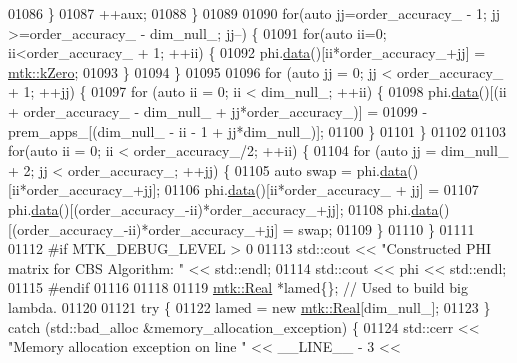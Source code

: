 \begin{DoxyCode}
{{01086       \}
01087       ++aux;
01088     \}
01089 
01090     \textcolor{keywordflow}{for}(\textcolor{keyword}{auto} jj=order\_accuracy\_ - 1; jj >=order\_accuracy\_ - dim\_null\_; jj--) \{
01091       \textcolor{keywordflow}{for}(\textcolor{keyword}{auto} ii=0; ii<order\_accuracy\_ + 1; ++ii) \{
01092         phi.\hyperlink{classmtk_1_1DenseMatrix_a0c33b8a9e01d157c61ddbdf807c25d84}{data}()[ii*order\_accuracy\_+jj] = \hyperlink{group__c01-roots_ga59a451a5fae30d59649bcda274fea271}{mtk::kZero};
01093       \}
01094     \}
01095 
01096     \textcolor{keywordflow}{for} (\textcolor{keyword}{auto} jj = 0; jj < order\_accuracy\_ + 1; ++jj) \{
01097       \textcolor{keywordflow}{for} (\textcolor{keyword}{auto} ii = 0; ii < dim\_null\_; ++ii) \{
01098         phi.\hyperlink{classmtk_1_1DenseMatrix_a0c33b8a9e01d157c61ddbdf807c25d84}{data}()[(ii + order\_accuracy\_ - dim\_null\_ + jj*order\_accuracy\_)] =
01099           -prem\_apps\_[(dim\_null\_ - ii - 1 + jj*dim\_null\_)];
01100       \}
01101     \}
01102 
01103     \textcolor{keywordflow}{for}(\textcolor{keyword}{auto} ii = 0; ii < order\_accuracy\_/2; ++ii) \{
01104       \textcolor{keywordflow}{for} (\textcolor{keyword}{auto} jj = dim\_null\_ + 2; jj < order\_accuracy\_; ++jj) \{
01105         \textcolor{keyword}{auto} swap = phi.\hyperlink{classmtk_1_1DenseMatrix_a0c33b8a9e01d157c61ddbdf807c25d84}{data}()[ii*order\_accuracy\_+jj];
01106         phi.\hyperlink{classmtk_1_1DenseMatrix_a0c33b8a9e01d157c61ddbdf807c25d84}{data}()[ii*order\_accuracy\_ + jj] =
01107           phi.\hyperlink{classmtk_1_1DenseMatrix_a0c33b8a9e01d157c61ddbdf807c25d84}{data}()[(order\_accuracy\_-ii)*order\_accuracy\_+jj];
01108         phi.\hyperlink{classmtk_1_1DenseMatrix_a0c33b8a9e01d157c61ddbdf807c25d84}{data}()[(order\_accuracy\_-ii)*order\_accuracy\_+jj] = swap;
01109       \}
01110     \}
01111 
01112 \textcolor{preprocessor}{    #if MTK\_DEBUG\_LEVEL > 0}
01113     std::cout << \textcolor{stringliteral}{"Constructed PHI matrix for CBS Algorithm: "} << std::endl;
01114     std::cout << phi << std::endl;
01115 \textcolor{preprocessor}{    #endif}
01116 
01118 
01119     \hyperlink{group__c01-roots_gac080bbbf5cbb5502c9f00405f894857d}{mtk::Real} *lamed\{\};  \textcolor{comment}{// Used to build big lambda.}
01120 
01121     \textcolor{keywordflow}{try} \{
01122       lamed = \textcolor{keyword}{new} \hyperlink{group__c01-roots_gac080bbbf5cbb5502c9f00405f894857d}{mtk::Real}[dim\_null\_];
01123     \} \textcolor{keywordflow}{catch} (std::bad\_alloc &memory\_allocation\_exception) \{
01124       std::cerr << \textcolor{stringliteral}{"Memory allocation exception on line "} << \_\_LINE\_\_ - 3 <<
}}
\end{DoxyCode}
